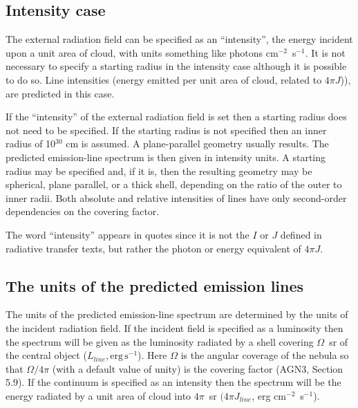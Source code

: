 \subsection{Intensity case}

The external radiation field can be specified as an ``intensity'',
the energy
incident upon a unit area of cloud, with units
something like photons cm$^{-2}$~s$^{-1}$.
It is not necessary to specify a starting radius in the intensity case
although it is possible to do so.
Line intensities (energy emitted per
unit area of cloud, related to $4\pi J$)), are predicted in this case.

If the ``intensity'' of the external radiation field is set then a starting radius does not
need to be specified.
If the starting radius is not specified then an inner
radius of 10$^{30}$ cm is assumed.  A plane-parallel geometry usually results.
The predicted emission-line spectrum is then given in intensity units.
A starting radius may be specified and, if it is, then the resulting geometry
may be spherical, plane parallel, or a thick shell, depending on the ratio
of the outer to inner radii.  Both absolute and relative intensities of
lines have only second-order dependencies on the covering factor.

The word ``intensity'' appears in quotes since it is
not the $I$ or $J$ defined in radiative transfer texts, but rather the photon
or energy equivalent of $4\pi J$.

\subsection{The units of the predicted emission lines}

The units of the predicted emission-line spectrum are determined by the
units of the incident radiation field.
If the incident field is specified as a
luminosity then the spectrum will be given as the luminosity radiated by
a shell covering  $\Omega$~sr of the central object ($L_{line}, \mathrm{erg\,
s}^{-1}$).  Here $\Omega$ is the
angular coverage of the nebula so that $\Omega/4\pi$ (with a default value of unity)
is the covering factor (AGN3, Section 5.9).  If the
continuum is specified as an intensity then the spectrum will be the energy
radiated by a unit area of cloud into $4\pi$~sr $(4\pi J_{line}$, erg
cm$^{-2}$~s$^{-1}$).

